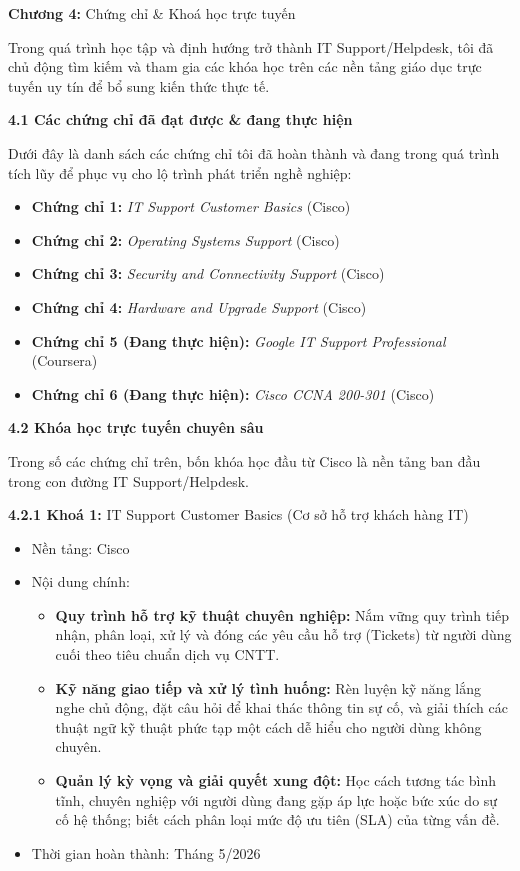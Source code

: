 \documentclass[
]{article}
\begin{document}
\textbf{Chương 4:} Chứng chỉ \& Khoá học trực tuyến

Trong quá trình học tập và định hướng trở thành IT Support/Helpdesk, tôi
đã chủ động tìm kiếm và tham gia các khóa học trên các nền tảng giáo dục
trực tuyến uy tín để bổ sung kiến thức thực tế.

\textbf{4.1 Các chứng chỉ đã đạt được \& đang thực hiện}

Dưới đây là danh sách các chứng chỉ tôi đã hoàn thành và đang trong quá
trình tích lũy để phục vụ cho lộ trình phát triển nghề nghiệp:

\begin{itemize}
\item
  \textbf{Chứng chỉ 1:} \emph{{IT Support Customer Basics}} (Cisco)
\item
  \textbf{Chứng chỉ 2:} \emph{{Operating Systems Support}} (Cisco)
\item
  \textbf{Chứng chỉ 3:} \emph{{Security and Connectivity Support}}
  (Cisco)
\item
  \textbf{Chứng chỉ 4:} \emph{{Hardware and Upgrade Support}} (Cisco)
\item
  \textbf{Chứng chỉ 5 (Đang thực hiện):} \emph{{Google IT Support
  Professional}} (Coursera)
\item
  \textbf{Chứng chỉ 6 (Đang thực hiện):} \emph{{Cisco CCNA 200-301}}
  (Cisco)
\end{itemize}

\textbf{4.2 Khóa học trực tuyến chuyên sâu}

Trong số các chứng chỉ trên, bốn khóa học đầu từ Cisco là nền tảng ban
đầu trong con đường IT Support/Helpdesk.

\textbf{4.2.1 Khoá 1:} IT Support Customer Basics (Cơ sở hỗ trợ khách
hàng IT)

\begin{itemize}
\item
  Nền tảng: Cisco
\item
  Nội dung chính:

  \begin{itemize}
  \item
    \textbf{Quy trình hỗ trợ kỹ thuật chuyên nghiệp:} Nắm vững quy trình
    tiếp nhận, phân loại, xử lý và đóng các yêu cầu hỗ trợ (Tickets) từ
    người dùng cuối theo tiêu chuẩn dịch vụ CNTT.
  \item
    \textbf{Kỹ năng giao tiếp và xử lý tình huống:} Rèn luyện kỹ năng
    lắng nghe chủ động, đặt câu hỏi để khai thác thông tin sự cố, và
    giải thích các thuật ngữ kỹ thuật phức tạp một cách dễ hiểu cho
    người dùng không chuyên.
  \item
    \textbf{Quản lý kỳ vọng và giải quyết xung đột:} Học cách tương tác
    bình tĩnh, chuyên nghiệp với người dùng đang gặp áp lực hoặc bức xúc
    do sự cố hệ thống; biết cách phân loại mức độ ưu tiên (SLA) của từng
    vấn đề.
  \end{itemize}
\item
  Thời gian hoàn thành: Tháng 5/2026
\end{itemize}
\end{document}
